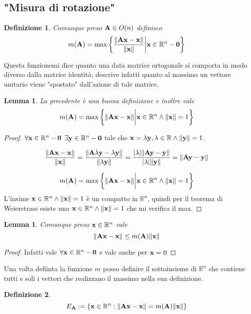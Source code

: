 \documentclass[10pt,a4paper]{book}
\newtheorem{definition}{Definizione}[section]
\newtheorem{lemma}[theorem]{Lemma}
\begin{document}
\subsection{"Misura di rotazione"}
\begin{definition}
Comunque preso  $  \vb{A} \in O(n) $  definisco
\[ m(\vb{A}) = \max \bigg\{ \frac{\norm{\vb{Ax-x}}}{\norm{\vb{x}}} \bigg|  \vb{x} \in \mathbb{R}^{n}-\vb{0} \bigg\} \]
\end{definition}
Questa funzionemi dice quanto una data matrice ortogonale si comporta in modo diverso dalla matrice identità; descrive infatti quanto al massimo un vettore unitario viene "spostato" dall'azione di tale matrice. 
\begin{lemma}
La precedente è una buona definizione e inoltre vale
\[ m(\vb{A}) = \max \bigg\{ \norm{\vb{Ax-x}} \bigg|  \vb{x} \in \mathbb{R}^{n} \land \norm{\vb{x}} = 1 \bigg\} \]
\end{lemma}

\begin{proof}
$ \forall \vb{x} \in \mathbb{R}^{n}-\vb{0}$  $ \exists \vb{y} \in \mathbb{R}^{n}-\vb{0} $ tale che \hfill $\vb{x} = \lambda \vb{y} , \lambda \in \mathbb{R} \land \norm{\vb{y}} = 1 $. 

\[ \frac{\norm{\vb{Ax-x}}}{\norm{\vb{x}}} = \frac{\norm{\vb{A}\lambda \vb{y}-\lambda \vb{y}}}{\norm{\lambda \vb{y}}} =   \frac{|\lambda| \norm{\vb{Ay-y}}}{|\lambda| \norm{\vb{ y}}} = \norm{\vb{Ay-y}} \]

\[ m(\vb{A}) = \max \bigg\{ \norm{\vb{Ax-x}} \bigg|  \vb{x} \in \mathbb{R}^{n} \land \norm{\vb{x}} = 1 \bigg\}\] L'insime $\vb{x} \in \mathbb{R}^{n} \land \norm{\vb{x}} = 1 $  è un compatto in  $\mathbb{R}^{n}$, quindi per il teorema di Weierstrass esiste una $\vb{x} \in \mathbb{R}^{n} \land \norm{\vb{x}} = 1$ che mi verifica il max. 
\end{proof}

\begin{lemma}
Comunque preso $ \vb{x} \in \mathbb{R}^{n}$  vale  \[ \norm{\vb{Ax-x}} \leq m(\vb{A}) \norm{\vb{x}} \]
\end{lemma}

\begin{proof}
Infatti vale $\forall \vb{x} \in \mathbb{R}^{n}-\vb{0}$  e vale anche per  $\vb{x}=0$
\end{proof}
Una volta defiinta la funzione $m$ posso definire il sottoinsieme di $\mathbb{R}^n$ che contiene tutti e soli i vettori che realizzano il massimo nella sua definizione. 
\begin{definition}
\[ E_{\vb{A}} := \{ \vb{x} \in \mathbb{R}^{n} :  \norm{\vb{Ax - x}} = m(\vb{A}) \norm{\vb{x}}\} \]
\end{definition}
\end{document}
